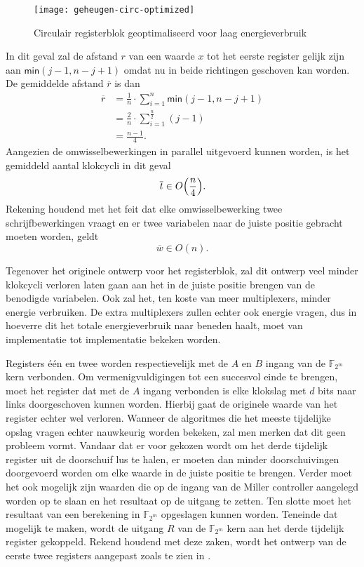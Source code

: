 \begin{figure}[h]
	\centering
		\texttt{[image: geheugen-circ-optimized]}
		\caption{Circulair registerblok geoptimaliseerd voor laag energieverbruik\label{figuur-implementatie-miller-geheugen-circ-optimized}}
\end{figure}

In dit geval zal de afstand $r$ van een waarde $x$ tot het eerste register gelijk zijn aan $\textsf{min}(j - 1, n - j + 1)$ omdat nu in beide richtingen geschoven kan worden. De gemiddelde afstand $\overline{r}$ is dan
\[\begin{aligned}
\overline{r}	&= \frac{1}{n} \cdot \sum_{i = 1}^{n} \textsf{min}(j - 1, n - j + 1)\\
	&= \frac{2}{n} \cdot \sum_{i = 1}^{\frac{n}{2}} (j - 1)\\
	&= \frac{n - 1}{4}.
\end{aligned}\]
Aangezien de omwisselbewerkingen in parallel uitgevoerd kunnen worden, is het gemiddeld aantal klokcycli in dit geval
\[\overline{t} \in O  \Bigl( \frac{n}{4} \Bigr).\]
Rekening houdend met het feit dat elke omwisselbewerking twee schrijfbewerkingen vraagt en er twee variabelen naar de juiste positie gebracht moeten worden, geldt
\[\overline{w} \in O(n).\]

Tegenover het originele ontwerp voor het registerblok, zal dit ontwerp veel minder klokcycli verloren laten gaan aan het in de juiste positie brengen van de benodigde variabelen. Ook zal het, ten koste van meer multiplexers, minder energie verbruiken. De extra multiplexers zullen echter ook energie vragen, dus in hoeverre dit het totale energieverbruik naar beneden haalt, moet van implementatie tot implementatie bekeken worden. 

Registers \'e\'en en twee worden respectievelijk met de $A$ en $B$ ingang van de $\mathbb{F}_{2^m}$ kern verbonden. Om vermenigvuldigingen tot een succesvol einde te brengen, moet het register dat met de $A$ ingang verbonden is elke klokslag met $d$ bits naar links doorgeschoven kunnen worden. Hierbij gaat de originele waarde van het register echter wel verloren. Wanneer de algoritmes die het meeste tijdelijke opslag vragen echter nauwkeurig worden bekeken, zal men merken dat dit geen probleem vormt. Vandaar dat er voor gekozen wordt om het derde tijdelijk register uit de doorschuif lus te halen, er moeten dan minder doorschuivingen doorgevoerd worden om elke waarde in de juiste positie te brengen. Verder moet het ook mogelijk zijn waarden die op de ingang van de Miller controller aangelegd worden op te slaan en het resultaat op de uitgang te zetten. Ten slotte moet het resultaat van een berekening in $\mathbb{F}_{2^m}$ opgeslagen kunnen worden. Teneinde dat mogelijk te maken, wordt de uitgang $R$ van de $\mathbb{F}_{2^m}$ kern aan het derde tijdelijk register gekoppeld. Rekend houdend met deze zaken, wordt het ontwerp van de eerste twee registers aangepast zoals te zien in .

